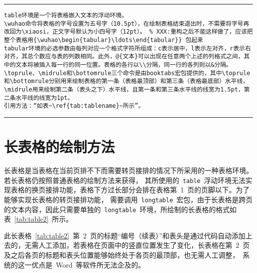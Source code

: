 \noindent\hrule

\begin{verbatim}
table环境是一个将表格嵌入文本的浮动环境。
\wuhao命令将表格的字号设置为五号字（10.5pt），在绘制表格结束退出时，不需要将字号再改回为\xiaosi，正文字号默认为小四号字（12pt）。 % XXX:重构之后不能这样做了，应该把整个表格用{\wuhao\begin{tabular}\ldots\end{tabular}} 包起来
tabular环境的必选参数由每列对应一个格式字符所组成：c表示居中，l表示左对齐，r表示右对齐，其总个数应与表的列数相同。此外，@{文本}可以出现在任意两个上述的列格式之间，其中的文本将被插入每一行的同一位置。表格的各行以\\分隔，同一行的各列则以&分隔。
\toprule、\midrule和\bottomrule三个命令是由booktabs宏包提供的，其中\toprule和\bottomrule分别用来绘制表格的第一条（表格最顶部）和第三条（表格最底部）水平线，\midrule用来绘制第二条（表头之下）水平线，且第一条和第三条水平线的线宽为1.5pt，第二条水平线的线宽为1pt。
引用方法：“如表~\ref{tab:tablename}~所示”。
\end{verbatim}

\noindent\hrule

\section{长表格的绘制方法}

长表格是当表格在当前页排不下而需要转页接排的情况下所采用的一种表格环境。若长表格仍按照普通表格的绘制方法来获得，
其所使用的~\verb|table|~浮动环境无法实现表格的换页接排功能，表格下方过长部分会排在表格第~1~页的页脚以下。为了能够实现长表格的转页接排功能，
需要调用~\verb|longtable|~宏包，由于长表格是跨页的文本内容，因此只需要单独的~\verb|longtable|~环境，所绘制的长表格的格式如表~\ref{tab:table2}~所示。

此长表格~\ref{tab:table2}~第~2~页的标题“编号（续表）”和表头是通过代码自动添加上去的，无需人工添加，若表格在页面中的竖直位置发生了变化，长表格在第~2~页
及之后各页的标题和表头位置能够始终处于各页的最顶部，也无需人工调整，\XeLaTeX~系统的这一优点是~Word~等软件所无法企及的。

